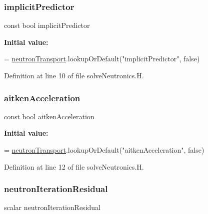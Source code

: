 \subsubsection{\texorpdfstring{implicit\+Predictor}{implicitPredictor}}
{\footnotesize\ttfamily const bool implicit\+Predictor}

{\bfseries Initial value\+:}
\begin{DoxyCode}
=
    \hyperlink{solveNeutronics_8H_ac82f3800c6fe7f00c65fbf04d3c1050d}{neutronTransport}.lookupOrDefault(\textcolor{stringliteral}{"implicitPredictor"}, \textcolor{keyword}{false})
\end{DoxyCode}


Definition at line 10 of file solve\+Neutronics.\+H.

\mbox{\label{solveNeutronics_8H_a94a477396c84cabf64ee11e6cc47bc86}} 
\subsubsection{\texorpdfstring{aitken\+Acceleration}{aitkenAcceleration}}
{\footnotesize\ttfamily const bool aitken\+Acceleration}

{\bfseries Initial value\+:}
\begin{DoxyCode}
=
    \hyperlink{solveNeutronics_8H_ac82f3800c6fe7f00c65fbf04d3c1050d}{neutronTransport}.lookupOrDefault(\textcolor{stringliteral}{"aitkenAcceleration"}, \textcolor{keyword}{false})
\end{DoxyCode}


Definition at line 12 of file solve\+Neutronics.\+H.

\mbox{\label{solveNeutronics_8H_a868e32a0d29170b5c556eabe69917730}} 
\subsubsection{\texorpdfstring{neutron\+Iteration\+Residual}{neutronIterationResidual}}
{\footnotesize\ttfamily scalar neutron\+Iteration\+Residual}

